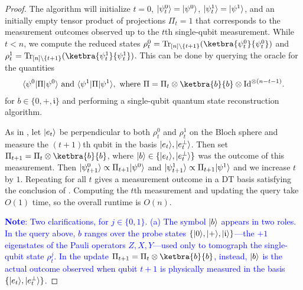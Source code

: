 \begin{proof}
    The algorithm will initialize $t=0$, $\lvert\smash{\psi^0_t}\rangle=\lvert\smash{\psi^0}\rangle$, $\lvert\smash{\psi^1_t}\rangle=\lvert\smash{\psi^1}\rangle$, and an initially empty tensor product of projections $\Pi_t=1$ that corresponds to the measurement outcomes observed up to the $t$th single-qubit measurement. While $t<n$, we compute the reduced states $\rho^0_t = \Tr_{[n]\setminus \{t+1\}}(\ketbra{\smash{\psi^0_t}}{\smash{\psi^0_t}})$ and $\rho^1_t = \Tr_{[n]\setminus \{t+1\}}(\ketbra{\smash{\psi^1_t}}{\smash{\psi^1_t}})$. This can be done by querying the oracle for the quantities
    \begin{align*}
        \bra{\smash{\psi^0}}\Pi\ket{\smash{\psi^0}}\text{ and }\bra{\smash{\psi^1}}\Pi\ket{\smash{\psi^1}},\text{ where }\Pi = \Pi_t \otimes \ketbra{b}{b} \otimes \Id^{\otimes (n - t - 1)}.
    \end{align*}
    for $b\in\{0,+,\mathfrak{i}\}$ and performing a single-qubit quantum state reconstruction algorithm. 
    
    As in , let $\lvert e_t\rangle$ be perpendicular to both $\rho^0_t$ and $\rho^1_t$ on the Bloch sphere and measure the $(t+1)$th qubit in the basis $\lvert e_t\rangle,\lvert\smash{e_t^\perp}\rangle$. Then set $\Pi_{t+1}=\Pi_t \otimes\ketbra{b}{b}$, where $\lvert b\rangle\in \{\lvert e_t\rangle,\lvert\smash{e^\perp_t}\rangle\}$ was the outcome of this measurement. Then $\lvert\smash{\psi^0_{t+1}}\rangle\propto\Pi_{t+1}\lvert\smash{\psi^0}\rangle$ and $\lvert\smash{\psi^1_{t+1}}\rangle\propto\Pi_{t+1}\lvert\smash{\psi^1}\rangle$ and we increase $t$ by $1$. Repeating for all $t$ gives a measurement outcome in a DT basis satisfying the conclusion of . Computing the $t$th measurement and updating the query take $O(1)$ time, so the overall runtime is $O(n)$.

\textcolor{blue}{\textbf{Note}: Two clarifications, for $j\in\{0,1\}$. 
(a) The symbol $\lvert b\rangle$ appears in two roles. In the query above, 
$b$ ranges over the probe states $\{\lvert0\rangle,\lvert+\rangle,\lvert\mathfrak{i}\rangle\}$---the 
$+1$ eigenstates of the Pauli operators $Z,X,Y$---used only to 
tomograph the single-qubit state $\rho^j_t$. 
In the update $\Pi_{t+1}=\Pi_t\otimes\ketbra{b}{b}$, instead, 
$\lvert b\rangle$ is the actual outcome observed when qubit 
$t+1$ is physically measured in the basis $\{\lvert e_t\rangle,\lvert\smash{e_t^\perp}\rangle\}$.}


\end{proof}
